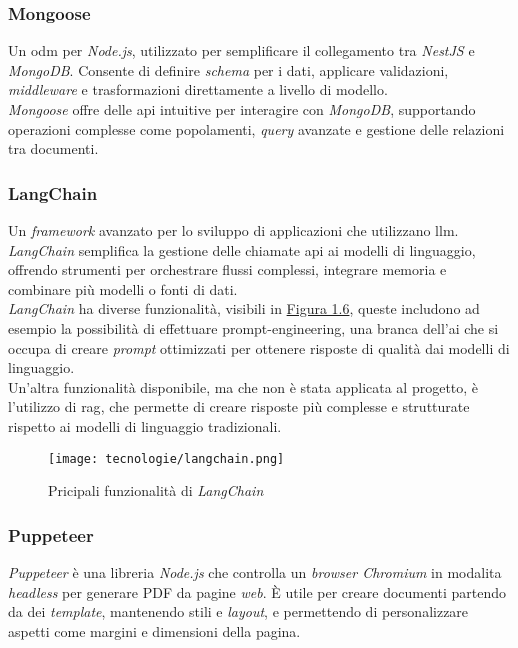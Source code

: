 \subsubsection{Mongoose}

Un \gls{odm} per \textit{Node.js}, utilizzato per semplificare il collegamento tra \textit{NestJS} e \textit{MongoDB}. Consente di definire \textit{schema} per i dati, applicare validazioni, \textit{middleware} e trasformazioni direttamente a livello di modello. \\
\textit{Mongoose} offre delle \gls{api} intuitive per interagire con \textit{MongoDB}, supportando operazioni complesse come popolamenti, \textit{query} avanzate e gestione delle relazioni tra documenti. 

\subsubsection{LangChain}

Un \textit{framework} avanzato per lo sviluppo di applicazioni che utilizzano \gls{llm}. 
\textit{LangChain} semplifica la gestione delle chiamate \gls{api} ai modelli di linguaggio, offrendo strumenti per orchestrare flussi complessi, integrare memoria e combinare più modelli o fonti di dati.\\
\textit{LangChain} ha diverse funzionalità, visibili in {\hyperref[fig:langchain-usecases]{Figura 1.6}}, queste includono ad esempio la possibilità di effettuare \gls{prompt-engineering}, una branca dell'\gls{ai} che si occupa di creare \textit{prompt} ottimizzati per ottenere risposte di qualità dai modelli di linguaggio.\\
Un'altra funzionalità disponibile, ma che non è stata applicata al progetto, è l'utilizzo di \gls{rag}, che permette di creare risposte più complesse e strutturate rispetto ai modelli di linguaggio tradizionali.\\
\begin{figure}[H]
    \label{fig:langchain-usecases}
    \centering
    \texttt{[image: tecnologie/langchain.png]}
    \caption{Pricipali funzionalità di \textit{LangChain}}
\end{figure}
\subsubsection{Puppeteer}

\textit{Puppeteer} è una libreria \textit{Node.js} che controlla un \textit{browser Chromium} in modalita \textit{headless} per generare PDF da pagine \textit{web}.
È utile per creare documenti partendo da dei \textit{template}, mantenendo stili e \textit{layout}, e permettendo di personalizzare aspetti come margini e dimensioni della pagina.


